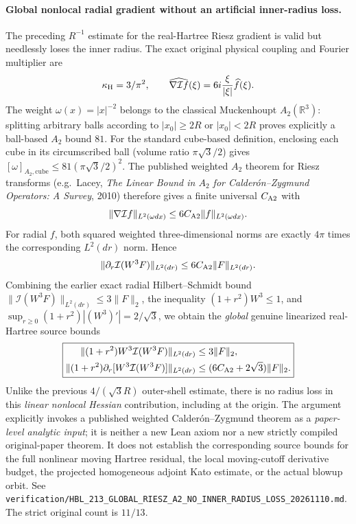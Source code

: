 \documentclass[11pt]{amsart}
\begin{document}
\paragraph{Global nonlocal radial gradient without an artificial inner-radius loss.}
The preceding \(R^{-1}\) estimate for the real-Hartree Riesz
gradient is valid but needlessly loses the inner radius.
The exact original physical coupling and Fourier multiplier are
\[
 \kappa_{\rm H}=3/\pi^2,\qquad
 \widehat{\nabla\mathcal I f}(\xi)
 =6i\frac{\xi}{|\xi|}\widehat f(\xi).
\]
The weight \(\omega(x)=|x|^{-2}\) belongs to the classical
Muckenhoupt \(A_2(\mathbb R^3)\): splitting arbitrary balls
according to \(|x_0|\ge2R\) or \(|x_0|<2R\) proves explicitly
a ball-based \(A_2\) bound \(81\). For the
standard cube-based definition, enclosing each cube
in its circumscribed ball (volume ratio \(\pi\sqrt3/2\))
gives \([\omega]_{A_2,\mathrm{cube}}\le81(\pi\sqrt3/2)^2\).
The published weighted \(A_2\) theorem for Riesz transforms
(e.g.\ Lacey, \emph{The Linear Bound in \(A_2\) for
Calder\'on--Zygmund Operators: A Survey}, 2010)
therefore gives a finite universal \(C_{\rm A2}\) with
\[
 \|\nabla\mathcal I f\|_{L^2(\omega dx)}
 \le6C_{\rm A2}\|f\|_{L^2(\omega dx)}.
\]
For radial \(f\), both squared weighted three-dimensional
norms are exactly \(4\pi\) times the corresponding
\(L^2(dr)\) norm. Hence
\[
 \|\partial_r\mathcal I(W^3F)\|_{L^2(dr)}
 \le6C_{\rm A2}\|F\|_{L^2(dr)}.
\]
Combining the earlier exact radial Hilbert--Schmidt
bound \(\|\mathcal I(W^3F)\|_{L^2(dr)}\le3\|F\|_2\),
the inequality \((1+r^2)W^3\le1\), and
\(\sup_{r\ge0}(1+r^2)|(W^3)'|=2/\sqrt3\), we obtain
the \emph{global} genuine linearized real-Hartree source bounds
\[
 \boxed{
 \begin{aligned}
 \|(1+r^2)W^3\mathcal I(W^3F)\|_{L^2(dr)}
    &\le3\|F\|_2,\\
 \|(1+r^2)\partial_r[W^3\mathcal I(W^3F)]\|_{L^2(dr)}
    &\le(6C_{\rm A2}+2\sqrt3)\|F\|_2 .
 \end{aligned}}
\]
Unlike the previous \(4/(\sqrt3R)\) outer-shell
estimate, there is no radius loss in this \emph{linear
nonlocal Hessian} contribution, including at the origin.
The argument explicitly invokes a published weighted
Calder\'on--Zygmund theorem as a \emph{paper-level
analytic input}; it is neither a new Lean axiom nor a
new strictly compiled original-paper theorem.
It does not establish the corresponding source bounds for
the full nonlinear moving Hartree residual, the local
moving-cutoff derivative budget, the projected homogeneous
adjoint Kato estimate, or the actual blowup orbit.
See \texttt{verification/HBL\_213\_GLOBAL\_RIESZ\_A2\_NO\_INNER\_RADIUS\_LOSS\_20261110.md}.
The strict original count is \(11/13\).
\end{document}

